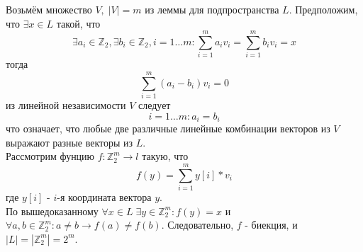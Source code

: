 \documentclass{article}
\begin{document}
	Возьмём множество $V, \; |V| = m $ из леммы для подпространства $L$. Предположим, что $\exists x \in L $ такой, что
	\[
		\exists a_i \in \mathbb{Z}_2, \exists b_i \in \mathbb{Z}_2, i = 1 \ldots m :
		\sum_{i=1}^{m} a_i v_i = \sum_{i=1}^{m} b_i v_i = x
	\]
	тогда
	\[
		\sum_{i=1}^{m} (a_i - b_i) v_i = 0
	\]
	из линейной независимости $V$ следует
	\[
		i = 1 \ldots m: a_i = b_i
	\]
	что означает, что любые две различные линейные комбинации векторов из $ V $ выражают разные векторы из $ L $.\\
	Рассмотрим фунцию $ f: \mathbb{Z}_2^m \rightarrow l $ такую, что
	\[
		f(y) = \sum_{i=1}^{m} y[i] * v_i
	\]
	где $ y[i] $ - $i$-я координата вектора $ y $.\\
	 По вышедоказанному 
	$ \forall x \in L \; \exists y \in \mathbb{Z}_2^m: f(y) = x$ и 
	$ \forall a, b \in \mathbb{Z}_2^m: a \neq b \rightarrow f(a) \neq f(b) $. Следовательно, $f$ - биекция, и 
	$ |L| = |\mathbb{Z}_2^m| = 2 ^ m $.
\end{document}
